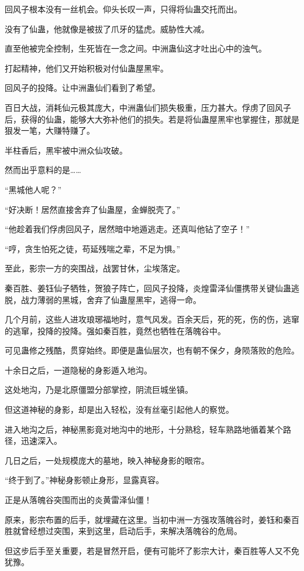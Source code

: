 \begin{this_body}
回风子根本没有一丝机会。仰头长叹一声，只得将仙蛊交托而出。

没有了仙蛊，他就像是被拔了爪牙的猛虎。威胁性大减。

直至他被完全控制，生死皆在一念之间。中洲蛊仙这才吐出心中的浊气。

打起精神，他们又开始积极对付仙蛊屋黑牢。

回风子的投降。让中洲蛊仙们看到了希望。

百日大战，消耗仙元极其庞大，中洲蛊仙们损失极重，压力甚大。俘虏了回风子后，获得的仙蛊，能够大大弥补他们的损失。若是将仙蛊屋黑牢也掌握住，那就是狠发一笔，大赚特赚了。

半柱香后，黑牢被中洲众仙攻破。

然而出乎意料的是……

“黑城他人呢？”

“好决断！居然直接舍弃了仙蛊屋，金蝉脱壳了。”

“他趁着我们俘虏回风子，居然暗中地遁逃走。还真叫他钻了空子！”

“哼，贪生怕死之徒，苟延残喘之辈，不足为惧。”

至此，影宗一方的突围战，战罢甘休，尘埃落定。

秦百胜、姜钰仙子牺牲，贺狼子阵亡，回风子投降，炎煌雷泽仙僵携带关键仙蛊逃脱，战力薄弱的黑城，舍弃了仙蛊屋黑牢，逃得一命。

几个月前，这些人进攻琅琊福地时，意气风发。百余天后，死的死，伤的伤，逃窜的逃窜，投降的投降。强如秦百胜，竟然也牺牲在落魄谷中。

可见蛊修之残酷，贯穿始终。即便是蛊仙层次，也有朝不保夕，身陨落败的危险。

十余日之后，一道隐秘的身影遁入地沟。

这处地沟，乃是北原僵盟分部掌控，阴流巨城坐镇。

但这道神秘的身影，却是出入轻松，没有丝毫引起他人的察觉。

进入地沟之后，神秘黑影竟对地沟中的地形，十分熟稔，轻车熟路地循着某个路径，迅速深入。

几日之后，一处规模庞大的墓地，映入神秘身影的眼帘。

“终于到了。”神秘身影顿止身形，显露真容。

正是从落魄谷突围而出的炎黄雷泽仙僵！

原来，影宗布置的后手，就埋藏在这里。当初中洲一方强攻落魄谷时，姜钰和秦百胜就曾经想过突围，来到这里，启动后手，来解决落魄谷的危局。

但这步后手至关重要，若是冒然开启，便有可能坏了影宗大计，秦百胜等人又不免犹豫。


\end{this_body}
